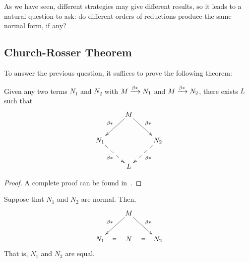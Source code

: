 As we have seen, different strategies may give different results, so it leads to
a natural question to ask: do different orders of reductions produce the same
normal form, if any? 

\subsection{Church-Rosser Theorem}
To answer the previous question, it suffices to prove the following theorem:
\begin{theorem}
  Given any two terms $N_1$ and $N_2$ with $M \xrightarrow{\beta*} N_1$ and $M\xrightarrow{\beta*} N_2$,
  there exists $L$ such that
  \[
    \xymatrix{
      & M \ar[rd]^{\beta*} \ar[ld]_{\beta*} \\
      N_1 \ar@{-->}[rd]_{\beta*} & & N_2 \ar@{-->}[ld]^{\beta*} \\
      & L
    }
  \]
\end{theorem}
\begin{proof}
  A complete proof can be found in~\cite[Chapter 4]{Barendregt1984}.
\end{proof}
\begin{corollary}\label{coro:uniqueness-normal}
  Suppose that $N_1$ and $N_2$ are normal. Then, 
  \[
    \xymatrix{
      & M \ar[rd]^{\beta*} \ar[ld]_{\beta*} \\
      N_1 \ar@{}[r]|{=} & N & N_2 \ar@{}[l]|{=} \\
    }
  \]
  That is, $N_1$ and $N_2$ are equal.
\end{corollary}

